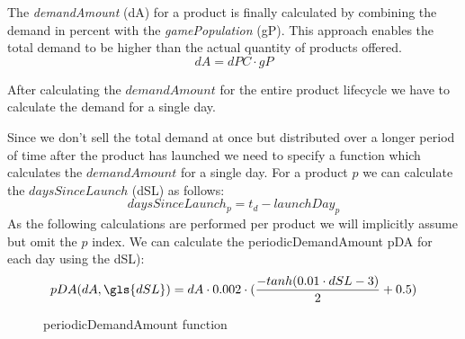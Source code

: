 The \textit{demandAmount} (\gls{dA}) for a product is finally calculated by combining the demand in percent with the \textit{gamePopulation} (\gls{gP}). This approach enables the total demand to be higher than the actual quantity of products offered.
\begin{equation}
\label{func:demandAmount}
dA = dPC \cdot gP    
\end{equation}

After calculating the $demandAmount$ for the entire product lifecycle we have to calculate the demand for a single day.

Since we don't sell the total demand at once but distributed over a longer period of time after the product has launched we need to specify a function which calculates the $demandAmount$ for a single day. For a product $p$ we can calculate the $daysSinceLaunch$ (\gls{dSL}) as follows:
\begin{equation}
	daysSinceLaunch_p = t_d -launchDay_{p}
\end{equation}
As the following calculations are performed per product we will implicitly assume but omit the $p$ index.
We can calculate the periodicDemandAmount \gls{pDA} for each day using the \gls{dSL}):
\begin{equation}
\begin{aligned}
pDA(dA, \gls{dSL}) = dA \cdot 0.002\cdot (\frac{-tanh(0.01 \cdot dSL-3)}{2} + 0.5)
\end{aligned}
\end{equation}

\begin{figure}[h]
\centering
{}
	\caption{periodicDemandAmount function}
	\label{periodicDemandAmount_function}
\end{figure}


